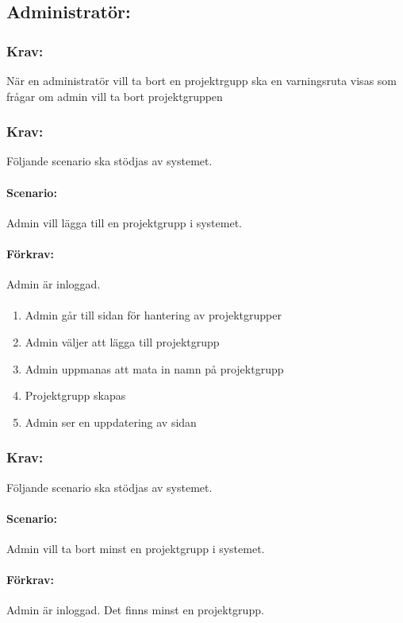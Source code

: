\documentclass[paper=a4, fontsize=11pt,twoside]{article}
\begin{document}
	\subsection{Administratör:}
	\subsubsection{Krav:}
	När en administratör vill ta bort en projektrgupp ska en varningsruta visas som frågar om admin vill ta bort projektgruppen
	
	\subsubsection{Krav:} Följande scenario ska stödjas av systemet.
	\paragraph{Scenario:}
	Admin vill lägga till en projektgrupp i systemet.
	\paragraph{Förkrav:}
	Admin är inloggad.
	\paragraph{}
	\begin{enumerate}
		\item Admin går till sidan för hantering av projektgrupper
		\item Admin väljer att lägga till projektgrupp
		\item Admin uppmanas att mata in namn på projektgrupp
		\item Projektgrupp skapas
		\item Admin ser en uppdatering av sidan
	\end{enumerate}
	
	\subsubsection{Krav:} 
	Följande scenario ska stödjas av systemet.
	\paragraph{Scenario:}
	Admin vill ta bort minst en projektgrupp i systemet.
	\paragraph{Förkrav:}
	Admin är inloggad. Det finns minst en projektgrupp.
\end{document}
